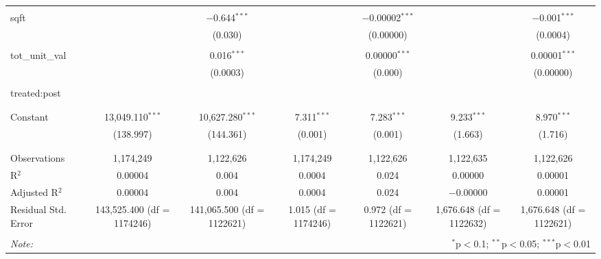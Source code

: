 \begin{table}[H]
{\begin{tabular}{@{\extracolsep{5pt}}lcccccc}
   & & & & & & \\  

  sqft &  & $-$0.644$^{***}$ &  & $-$0.00002$^{***}$ &  & $-$0.001$^{***}$ \\  

   &  & (0.030) &  & (0.00000) &  & (0.0004) \\  

   & & & & & & \\  

  tot\_unit\_val &  & 0.016$^{***}$ &  & 0.00000$^{***}$ &  & 0.00001$^{***}$ \\  

   &  & (0.0003) &  & (0.000) &  & (0.00000) \\  

   & & & & & & \\  

  treated:post &  &  &  &  &  &  \\  

   &  &  &  &  &  &  \\  

   & & & & & & \\  

  Constant & 13,049.110$^{***}$ & 10,627.280$^{***}$ & 7.311$^{***}$ & 7.283$^{***}$ & 9.233$^{***}$ & 8.970$^{***}$ \\  

   & (138.997) & (144.361) & (0.001) & (0.001) & (1.663) & (1.716) \\  

   & & & & & & \\  

 \hline \\[-1.8ex]  

 Observations & 1,174,249 & 1,122,626 & 1,174,249 & 1,122,626 & 1,122,635 & 1,122,626 \\  

 R$^{2}$ & 0.00004 & 0.004 & 0.0004 & 0.024 & 0.00000 & 0.00001 \\  

 Adjusted R$^{2}$ & 0.00004 & 0.004 & 0.0004 & 0.024 & $-$0.00000 & 0.00001 \\  

 Residual Std. Error & 143,525.400 (df = 1174246) & 141,065.500 (df = 1122621) & 1.015 (df = 1174246) & 0.972 (df = 1122621) & 1,676.648 (df = 1122632) & 1,676.648 (df = 1122621) \\  

 \hline  

 \hline \\[-1.8ex]  

 \textit{Note:}  & \multicolumn{6}{r}{$^{*}$p$<$0.1; $^{**}$p$<$0.05; $^{***}$p$<$0.01} \\  

 \end{tabular}}  

 \end{table}  

